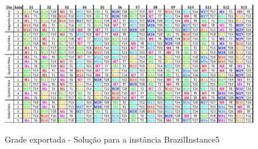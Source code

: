 \begin{figure}[h]
	\centering
	\caption{Grade exportada - Solução para a instância BrazilInstance5}
	\includegraphics[width=1\textwidth]{./dados/figuras/brazilinstance5}
	\label{fig:brazilinstance5_solucao}
\end{figure}

